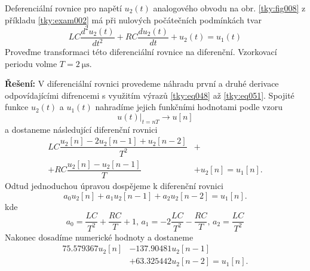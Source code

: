 \begin{mdframed}[style=mdexam]
  \begin{example}\label{tky:exam003}
    Deferenciální rovnice pro napětí \(u_2(t)\) analogového obvodu na obr. \ref{tky:fig008} z
    příkladu \ref{tky:exam002} má při nulových počátečních podmínkách tvar
    \begin{equation*}
      LC\frac{d^2u_2(t)}{dt^2}+RC\frac{du_2(t)}{dt}+u_2(t)=u_1(t)
    \end{equation*}
    Proveďme transformaci této diferenciální rovnice na diferenční. Vzorkovací periodu volme \(T =
    \SI{2}{\us}\). 

    \noindent\textbf{Řešení:}
    V diferenciální rovnici provedeme náhradu první a druhé derivace odpovídajícími difrencemi s
    využitím výrazů \ref{tky:eq048} až \ref{tky:eq051}. Spojité funkce \(u_2(t)\) a \(u_1(t)\)
    nahradíme jejich funkčními hodnotami podle vzoru
    \begin{equation*}
      \left.u(t)\right\rvert_{t=nT}  \rightarrow u[n]
    \end{equation*}
    a dostaneme následující diferenční rovnici
    \begin{align*}
        LC\dfrac{u_2[n] - 2u_2[n-1]    + u_2[n-2]}{T^2} &+      \\
      + RC\dfrac{u_2[n] - u_2[n-1]}{T}                  &+ u_2[n]=u_1[n]. 
    \end{align*}
    Odtud jednoduchou úpravou dospějeme k diferenční rovnici
    \begin{equation*}
      a_0u_2[n] + a_1u_2[n-1] + a_2u_2[n-2]=u_1[n].
    \end{equation*}
    kde
    \begin{equation*}
      a_0 = \frac{LC}{T^2} + \frac{RC}{T} + 1, \, a_1 = -2\frac{LC}{T^2} - \frac{RC}{T}, \,  
      a_2 = \frac{LC}{T^2}
    \end{equation*}
    Nakonec dosadíme numerické hodnoty a dostaneme
    \begin{align}
      \num{75.579367}u_2[n] &- \num{137.90481}u_2[n-1]                       \nonumber \\
                            &+ \num{63.325442}u_2[n-2] = u_1[n].             \label{tky:eq061}
    \end{align}
  \end{example}
\end{mdframed}